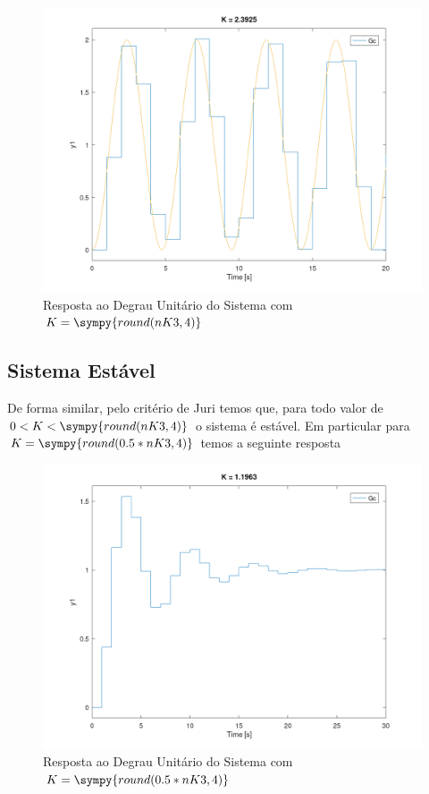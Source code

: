 \documentclass[a4paper,11pt]{article}
\newcommand{\npy}[1]{\sympy{round(#1,4)}}
\begin{document}
\begin{figure}[H]
    \label{fig:ex1-plot-oscilation}
    \centering
    \includegraphics[width=0.8\linewidth]{img/exsim1-plot-oscilation.png}
    \caption{Resposta ao Degrau Unitário do Sistema com $K = \npy{nK3}$}
\end{figure}

\subsection{Sistema Estável}

De forma similar, pelo critério de Juri temos que, para todo valor de $0< K < \npy{nK3}$ o sistema é estável. Em particular para $K = \npy{0.5*nK3}$ temos a seguinte resposta

\begin{figure}[H]
    \centering
    \includegraphics[width=0.8\linewidth]{img/exsim1-plot-stable.png}
    \caption{Resposta ao Degrau Unitário do Sistema com $K = \npy{0.5*nK3}$}
\end{figure}
\end{document}
